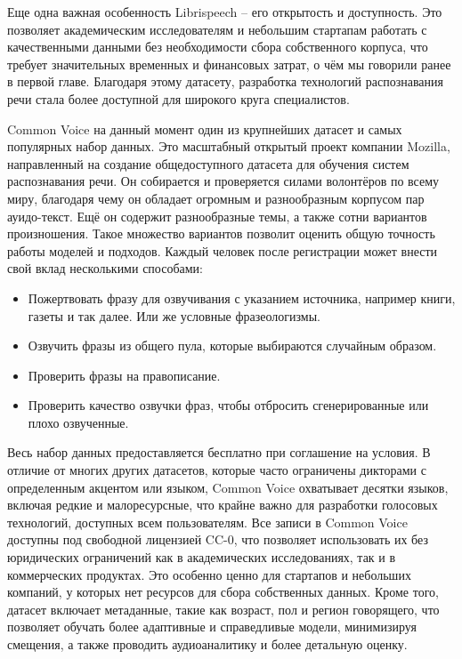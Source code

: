Еще одна важная особенность Librispeech -- его открытость и доступность.
Это позволяет академическим исследователям и небольшим стартапам работать с качественными данными без необходимости сбора собственного корпуса, что требует значительных временных и финансовых затрат, о чём мы говорили ранее в первой главе.
Благодаря этому датасету, разработка технологий распознавания речи стала более доступной для широкого круга специалистов.

Common Voice\cite{ardila2019common} на данный момент один из крупнейших датасет и самых популярных набор данных.
Это масштабный открытый проект компании Mozilla, направленный на создание общедоступного датасета для обучения систем распознавания речи. 
Он собирается и проверяется силами волонтёров по всему миру, благодаря чему он обладает огромным и разнообразным корпусом пар ауидо-текст.
Ещё он содержит разнообразные темы, а также сотни вариантов произношения.
Такое множество вариантов позволит оценить общую точность работы моделей и подходов.
Каждый человек после регистрации может  внести свой вклад несколькими способами:
\begin{itemize}
  \item Пожертвовать фразу для озвучивания с указанием источника, например книги, газеты и так далее.
    Или же условные фразеологизмы.
  \item Озвучить фразы из общего пула, которые выбираются случайным образом.
  \item Проверить фразы на правописание.
  \item Проверить качество озвучки фраз, чтобы отбросить сгенерированные или плохо озвученные.
\end{itemize}
Весь набор данных предоставляется бесплатно при соглашение на условия.
В отличие от многих других датасетов, которые часто ограничены дикторами с определенным акцентом или языком, Common Voice охватывает десятки языков, включая редкие и малоресурсные, что крайне важно для разработки голосовых технологий, доступных всем пользователям.
Все записи в Common Voice доступны под свободной лицензией CC-0, что позволяет использовать их без юридических ограничений как в академических исследованиях, так и в коммерческих продуктах.
Это особенно ценно для стартапов и небольших компаний, у которых нет ресурсов для сбора собственных данных.
Кроме того, датасет включает метаданные, такие как возраст, пол и регион говорящего, что позволяет обучать более адаптивные и справедливые модели, минимизируя смещения, а также проводить аудиоаналитику и более детальную оценку.

